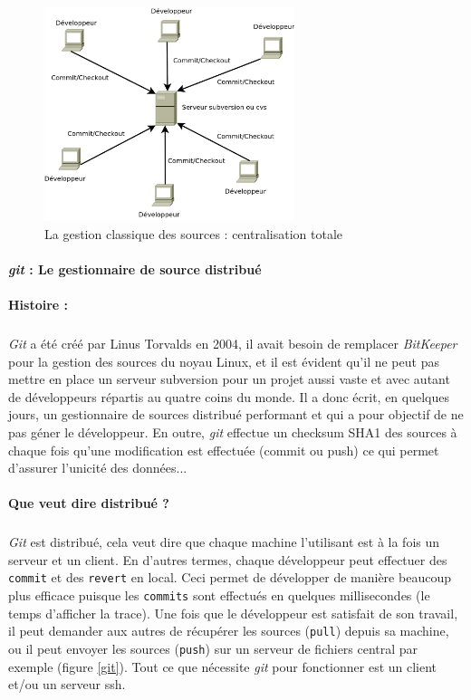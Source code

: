 \begin{figure}[H]
\begin{center}
        \includegraphics[width=0.65\textwidth]{./schema/svn.png}
\caption{La gestion classique des sources : centralisation totale }
\label{svn}
\end{center}
\end{figure}


\label{gitPar}
\paragraph{\textit{git} : Le gestionnaire de source distribué\\~\\Histoire :}
\subparagraph{}
\textit{Git} a été créé par Linus Torvalds en 2004, il avait besoin de remplacer \textit{BitKeeper} pour la gestion des sources du noyau Linux, et il est évident qu'il ne peut pas mettre en place un serveur subversion pour un projet aussi vaste et avec autant de développeurs répartis au quatre coins du monde. Il a donc écrit, en quelques jours, un gestionnaire de sources distribué performant et qui a pour objectif de ne pas géner le développeur. En outre, \textit{git} effectue un checksum SHA1 des sources à chaque fois qu'une modification est effectuée (commit ou push) ce qui permet d'assurer l'unicité des données...

\paragraph{Que veut dire distribué ?} 
\subparagraph{}
\textit{Git} est distribué, cela veut dire que chaque machine l'utilisant est à la fois un serveur et un client. En d'autres termes, chaque développeur peut effectuer des \verb|commit| et des \verb|revert| en local. Ceci permet de développer de manière beaucoup plus efficace puisque les \verb|commits| sont effectués en quelques millisecondes (le temps d'afficher la trace). Une fois que le développeur est satisfait de son travail, il peut demander aux autres de récupérer les sources (\verb|pull|)  depuis sa machine, ou il peut  envoyer les sources (\verb|push|) sur un serveur de fichiers central par exemple (figure \ref{git}). Tout ce que nécessite \textit{git} pour fonctionner est un client et/ou un serveur ssh.


